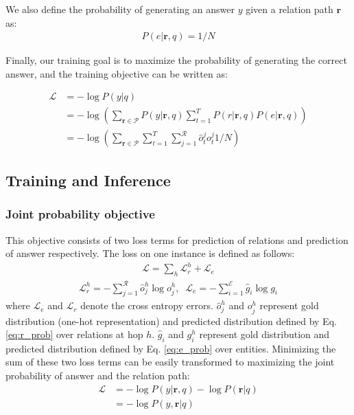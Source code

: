 We also define the probability of generating an answer $y$ given a relation path $\mathbf{r}$ as:
\begin{align}
P(e|\mathbf{r},q) = 1/N
\end{align}

Finally, our training goal is to maximize the probability of generating the correct answer, and the training objective can be written as:

\begin{equation}
\begin{aligned}
\mathcal{L} &= -\log P(y|q) \\
            &= -\log(\sum_{\mathbf{r}\in \mathcal{P}} P(y|\mathbf{r},q)\sum_{t=1}^T P(r|\mathbf{r},q)P(e|\mathbf{r},q))\\
            &= -\log(\sum_{\mathbf{r}\in \mathcal{P}} \sum_{t=1}^T\sum_{j=1}^{\mathcal{R}}\hat{o}^j_t{o^j_t} 1/N)
\end{aligned}
\label{obj:latent}
\end{equation}


\subsection{Training and Inference}





\subsubsection{Joint probability objective} This objective consists of two loss terms for prediction of relations and prediction of answer respectively. The loss on one instance is defined as follows:
\begin{align}
 \mathcal{L} = \sum_{h}\mathcal{L}_r^{h} + \mathcal{L}_e 
 \end{align}
  \vspace{-3ex}
\begin{align}
 \mathcal{L}_r^{h} = -\sum_{j=1}^{\mathcal{R}}\hat{o}^h_j\log{o^h_j},\;\;\mathcal{L}_e = -\sum_{i=1}^{\mathcal{E}}\hat{g}_i\log{g_i}
\end{align}
where $\mathcal{L}_e$ and $\mathcal{L}_r$ denote the cross entropy errors. $\hat{o}^h_j$ and $o^h_j$ represent gold distribution (one-hot representation) and predicted distribution defined by Eq. \ref{eq:r_prob} over relations at hop $h$. $\hat{g}_i$ and $g^h_i$ represent gold distribution and predicted distribution defined by Eq. \ref{eq:e_prob} over entities. Minimizing the sum of these two loss terms can be easily transformed to maximizing the joint probability of answer and the relation path:
\begin{equation}
\begin{aligned}
\mathcal{L} &= -\log P(y|\mathbf{r},q) - \log P(\mathbf{r}|q) \\
            &= -\log P(y,\mathbf{r}|q)
\end{aligned}
\end{equation}

